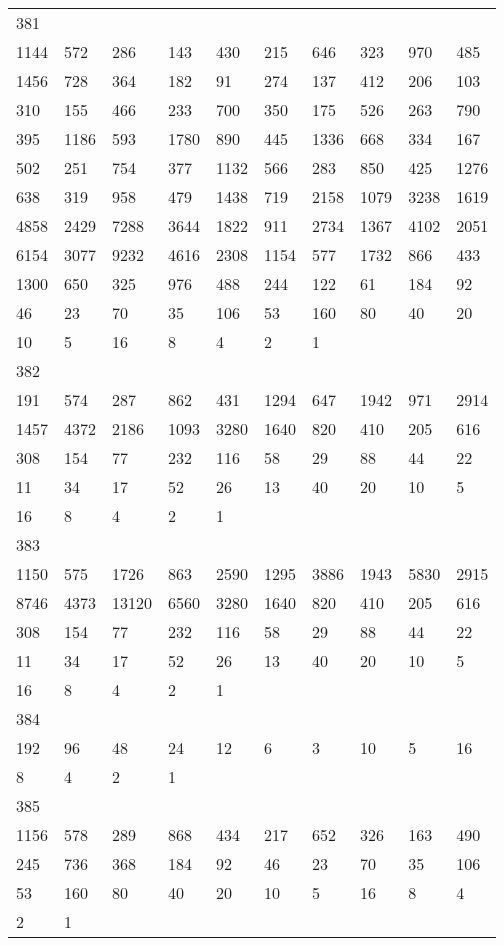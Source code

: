 \begin{longtable}{*{10}{l}}
381&&&&&&&&&\\
1144& 572& 286& 143& 430& 215& 646& 323& 970& 485\\
1456& 728& 364& 182& 91& 274& 137& 412& 206& 103\\
310& 155& 466& 233& 700& 350& 175& 526& 263& 790\\
395& 1186& 593& 1780& 890& 445& 1336& 668& 334& 167\\
502& 251& 754& 377& 1132& 566& 283& 850& 425& 1276\\
638& 319& 958& 479& 1438& 719& 2158& 1079& 3238& 1619\\
4858& 2429& 7288& 3644& 1822& 911& 2734& 1367& 4102& 2051\\
6154& 3077& 9232& 4616& 2308& 1154& 577& 1732& 866& 433\\
1300& 650& 325& 976& 488& 244& 122& 61& 184& 92\\
46& 23& 70& 35& 106& 53& 160& 80& 40& 20\\
10& 5& 16& 8& 4& 2& 1& \\

382&&&&&&&&&\\
191& 574& 287& 862& 431& 1294& 647& 1942& 971& 2914\\
1457& 4372& 2186& 1093& 3280& 1640& 820& 410& 205& 616\\
308& 154& 77& 232& 116& 58& 29& 88& 44& 22\\
11& 34& 17& 52& 26& 13& 40& 20& 10& 5\\
16& 8& 4& 2& 1& \\

383&&&&&&&&&\\
1150& 575& 1726& 863& 2590& 1295& 3886& 1943& 5830& 2915\\
8746& 4373& 13120& 6560& 3280& 1640& 820& 410& 205& 616\\
308& 154& 77& 232& 116& 58& 29& 88& 44& 22\\
11& 34& 17& 52& 26& 13& 40& 20& 10& 5\\
16& 8& 4& 2& 1& \\

384&&&&&&&&&\\
192& 96& 48& 24& 12& 6& 3& 10& 5& 16\\
8& 4& 2& 1& \\

385&&&&&&&&&\\
1156& 578& 289& 868& 434& 217& 652& 326& 163& 490\\
245& 736& 368& 184& 92& 46& 23& 70& 35& 106\\
53& 160& 80& 40& 20& 10& 5& 16& 8& 4\\
2& 1& \\


\end{longtable}
